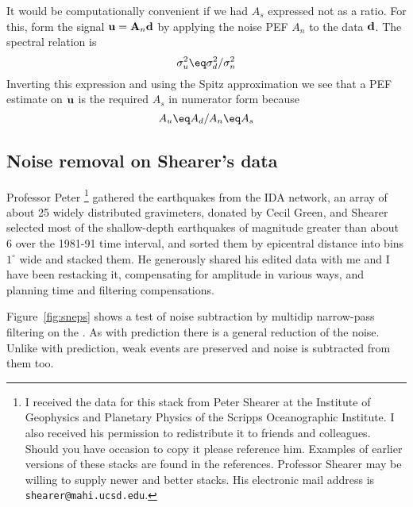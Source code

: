 \par
It would be computationally convenient if
we had $A_s$ expressed not as a ratio.
For this, form the signal
$\bold u = \bold A_n \bold d$
by applying the noise PEF $A_n$ to the data $\bold d$.
The spectral relation is
\begin{equation}
\sigma_u^2 \eq 
\sigma_d^2 /
\sigma_n^2
\end{equation}
Inverting this expression
and using the Spitz approximation
we see that
a PEF estimate on $\bold u$ is the required $A_s$ in numerator form because
\begin{equation}
A_u \eq A_d / A_n \eq A_s
\end{equation}

\subsection{Noise removal on Shearer's data}
Professor Peter \footnote{
        I received the data for this stack from Peter Shearer
        at the  Institute of Geophysics
        and Planetary Physics of the Scripps Oceanographic Institute.
        I also received his permission to redistribute it
        to friends and colleagues.
        Should you have occasion to copy it please reference him.
        Examples of earlier versions of these stacks
        are found in the references.
        Professor Shearer may be willing to supply newer and better stacks.
        His electronic mail address is {\tt shearer@mahi.ucsd.edu}.
        }
gathered the earthquakes from the IDA network,
an array of about 25 widely distributed gravimeters,
donated by Cecil Green,
and Shearer selected most of the shallow-depth earthquakes
of magnitude greater than about 6 over the 1981-91 time interval,
and sorted them by epicentral distance into bins $1^\circ$ wide
and stacked them.
He generously shared his edited data with me
and I have been restacking it,
compensating for amplitude in various ways,
and planning time and filtering compensations.

\par
Figure~\ref{fig:sneps} shows a test of noise subtraction
by multidip narrow-pass filtering
on the .
As with prediction there is a general reduction of the noise.
Unlike with prediction, weak events are preserved
and noise is subtracted from them too.

